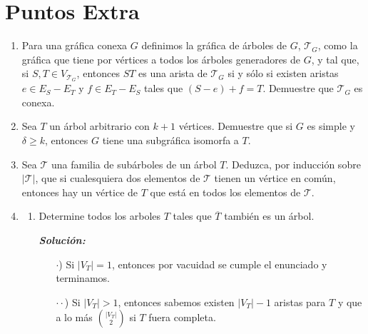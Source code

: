 \documentclass{article}
\begin{document}
  \section*{Puntos Extra}
  \begin{enumerate}
    \item Para una gr\'afica conexa $G$ definimos la
      gr\'afica de \'arboles de $G$, $\mathcal{T}_G$,
      como la gr\'afica que tiene por v\'ertices a
      todos los \'arboles generadores de $G$, y tal que,
      si $S, T \in V_{\mathcal{T}_G}$, entonces $ST$ es
      una arista de $\mathcal{T}_G$ si y s\'olo si
      existen aristas $e \in E_S - E_T$ y $f \in E_T -
      E_S$ tales que $(S - e) + f = T$.   Demuestre que
      $\mathcal{T}_G$ es conexa.

    \item Sea $T$ un \'arbol arbitrario con $k+1$ v\'ertices.
      Demuestre que si $G$ es simple y $\delta \ge k$,
      entonces $G$ tiene una subgr\'afica isomorfa a $T$.

    \item Sea $\mathcal{T}$ una familia de sub\'arboles
      de un \'arbol $T$.   Deduzca, por inducci\'on sobre
      $|\mathcal{T}|$, que si cualesquiera dos elementos
      de $\mathcal{T}$ tienen un v\'ertice en com\'un,
      entonces hay un v\'ertice de $T$ que est\'a en
      todos los elementos de $\mathcal{T}$.

    \item \begin{enumerate}
      \item Determine todos los arboles $T$ tales que
        $\overline T$ tambi\'en es un \'arbol.

        \textbf{\textit{Soluci\'on:}}
        \begin{itemize}
          \item[$\cdot$)]  Si $|V_T| = 1$, entonces por vacuidad se cumple
            el enunciado y terminamos.
          \item[$\cdot \cdot$)] Si $|V_T| > 1$, entonces sabemos existen $|V_T| -1$
            aristas para $T$ y que a lo más ${|V_T| \choose 2}$ si $T$ fuera
            completa.


\end{itemize}
\end{enumerate}
\end{enumerate}
\end{document}
